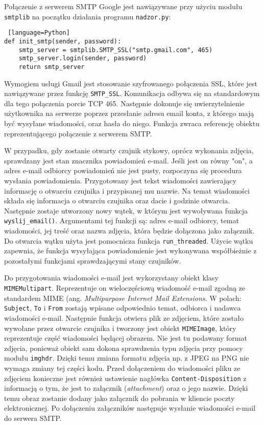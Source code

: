 \documentclass[a4paper,11pt,twoside]{article}
\begin{document}
Połączenie z serwerem SMTP Google jest nawiązywane przy użyciu modułu \texttt{smtplib} na początku działania programu \texttt{nadzor.py}: 
\begin{lstlisting} [language=Python]
def init_smtp(sender, password):
    smtp_server = smtplib.SMTP_SSL("smtp.gmail.com", 465)
    smtp_server.login(sender, password)
    return smtp_server 
\end{lstlisting}
Wymogiem usługi Gmail jest stosowanie szyfrowanego połączenia SSL, które jest nawiązywane przez funkcję \texttt{SMTP{\_}SSL}. Komunikacja odbywa się na standardowym dla tego połączenia porcie TCP 465. Następnie dokonuje się uwierzytelnienie użytkownika na serwerze poprzez przesłanie adresu email konta, z którego mają być wysyłane wiadomości, oraz hasła do niego. Funkcja zwraca referencję obiektu reprezentującego połączenie z serwerem SMTP.

W przypadku, gdy zostanie otwarty czujnik stykowy, oprócz wykonania zdjęcia, sprawdzany jest stan znacznika powiadomień e-mail. Jeśli jest on równy "on", a adres e-mail odbiorcy powiadomień nie jest pusty, rozpoczyna się procedura wysłania powiadomienia. Przygotowany jest tekst wiadomości zawierający informację o otwarciu czujnika i przypisanej mu nazwie. Na temat wiadomości składa się informacja o otwarciu czujnika oraz dacie i godzinie otwarcia. Następnie zostaje utworzony nowy wątek, w którym jest wywoływana funkcja \texttt{wyslij{\_}email()}. Argumentami tej funkcji są: adres e-mail odbiorcy, temat wiadomości, jej treść oraz nazwa zdjęcia, która będzie dołączona jako załącznik. Do otwarcia wątku użyta jest pomocnicza funkcja \texttt{run{\_}threaded}. Użycie wątku zapewnia, że funkcja wysyłająca powiadomienie jest wykonywana współbieżnie z pozostałymi funkcjami sprawdzającymi stany czujników.

Do przygotowania wiadomości e-mail jest wykorzystany obiekt klasy \texttt{MIMEMultipart}. Reprezentuje on wieloczęściową wiadomość e-mail zgodną ze standardem MIME (ang. \textit{Multipurpose Internet Mail Extensions}\cite{mime1}\cite{mime2}.  W polach: \texttt{Subject}, \texttt{To} i \texttt{From} zostają wpisane odpowiednio temat, odbiorca i nadawca wiadomości e-mail. Następnie funkcja otwiera plik ze zdjęciem, które zostało wywołane przez otwarcie czujnika i tworzony jest obiekt \texttt{MIMEImage}, który reprezentuje część wiadomości będącej obrazem. Nie jest tu podawany format zdjęcia, ponieważ obiekt sam dokona sprawdzenia typu zdjęcia przy pomocy modułu \texttt{imghdr}\cite{python-mime}. Dzięki temu zmiana formatu zdjęcia np. z JPEG na PNG nie wymaga zmiany tej części kodu. Przed dołączeniem do wiadomości pliku ze zdjęciem konieczne jest również ustawienie nagłówka \texttt{Content-Disposition} z informacją o tym, że jest to załącznik (\textit{attachment}) oraz o jego nazwie. Dzięki temu obraz zostanie dodany jako załącznik do pobrania w kliencie poczty elektronicznej\cite{content-disposition}. Po dołączeniu załączników następuje wysłanie wiadomości e-mail do serwera SMTP.
\newpage
\end{document}
